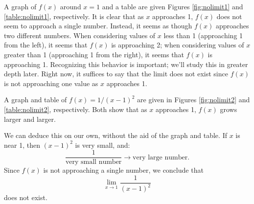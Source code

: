 %

%
{
A graph of $f(x)$ around $x=1$ and a table are given Figures \ref{fig:nolimit1} and \ref{table:nolimit1}, respectively. It is clear that as $x$ approaches 1, $f(x)$ does not seem to approach a single number. Instead, it seems as though $f(x)$ approaches two different numbers. When considering values of $x$ less than 1 (approaching 1 from the left), it seems that $f(x)$ is approaching 2; when considering values of $x$ greater than 1 (approaching 1 from the right), it seems that $f(x)$ is approaching 1. Recognizing this behavior is important; we'll study this in greater depth later. Right now, it suffices to say that the limit does not exist since $f(x)$ is not approaching one value as $x$ approaches 1.
}\\

%

%
%
{A graph and table of $f(x) = 1/(x-1)^2$ are given in Figures \ref{fig:nolimit2} and \ref{table:nolimit2}, respectively. Both show that as $x$ approaches 1, $f(x)$ grows larger and larger. 

We can deduce this on our own, without the aid of the graph and table. If $x$ is near 1, then $(x-1)^2$ is very small, and: $$\frac{1}{\text{very small number}} \rightarrow \text{very large number}.$$
Since $f(x)$ is not approaching a single number, we conclude that $$\lim_{x\to 1}\frac{1}{(x-1)^2}$$ does not exist.
}\\


